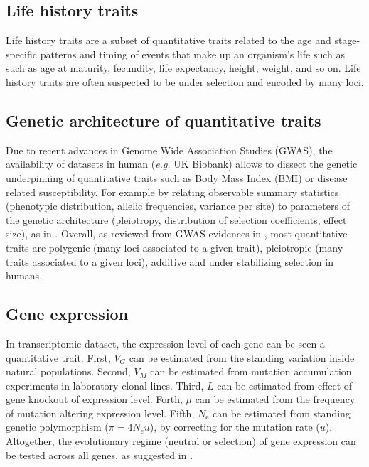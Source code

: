 \documentclass{article}
\newcommand{\Ne}{N_{\text{e}}}
\newcommand{\VarGenetic}{V_{G}}
\newcommand{\VarMutation}{V_{M}}
\newcommand{\MutationRate}{\mu}
\newcommand{\NbrLoci}{L}
\begin{document}
\subsection{Life history traits}

Life history traits are a subset of quantitative traits related to the age and stage-specific patterns and timing of events that make up an organism's life such as such as age at maturity, fecundity, life expectancy, height, weight, and so on. Life history traits are often suspected to be under selection and encoded by many loci.

\subsection{Genetic architecture of quantitative traits}
Due to recent advances in Genome Wide Association Studies (GWAS), the availability of  datasets in human (\textit{e.g.} UK Biobank) allows to dissect the genetic underpinning of quantitative traits such as Body Mass Index (BMI) or disease related susceptibility.
For example by relating observable summary statistics (phenotypic distribution, allelic frequencies, variance per site) to parameters of the genetic architecture (pleiotropy, distribution of selection coefficients, effect size), as in \citet{simons_population_2018}.
Overall, as reviewed from GWAS evidences in \citet{sella_thinking_2019}, most quantitative traits are polygenic (many loci associated to a given trait), pleiotropic (many traits associated to a given loci), additive and under stabilizing selection in humans.

\subsection{Gene expression}

In transcriptomic dataset, the expression level of each gene can be seen a quantitative trait.
First, $\VarGenetic$ can be estimated from the standing variation inside natural populations. 
Second, $\VarMutation$ can be  estimated from mutation accumulation experiments in laboratory clonal lines.
Third, $\NbrLoci$ can be  estimated from effect of gene knockout of expression level.
Forth, $\MutationRate$ can be  estimated from the frequency of mutation altering expression level.
Fifth, $\Ne$ can be estimated from standing genetic polymorphism ($\pi = 4 \Ne u$), by correcting for the mutation rate ($u$).
Altogether, the evolutionary regime (neutral or selection) of gene expression can be tested across all genes, as suggested in \citet{fay_evaluating_2008}.
\end{document}

